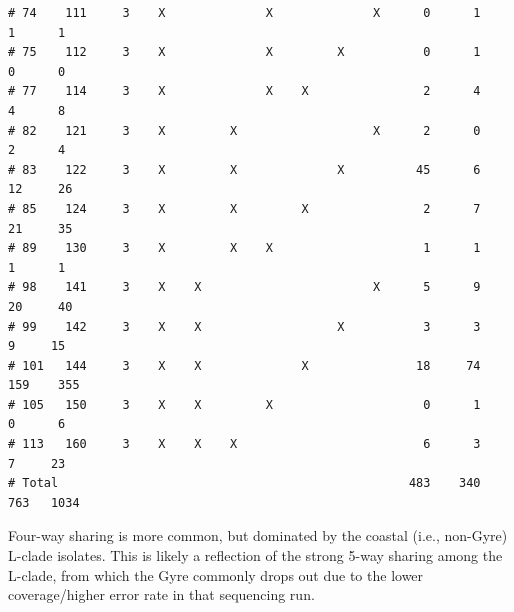 \documentclass{article}\usepackage[]{graphicx}\usepackage[]{color}
\makeatletter
\newenvironment{kframe}{%
 \def\at@end@of@kframe{}%
 \ifinner\ifhmode%
  \def\at@end@of@kframe{\end{minipage}}%
  \begin{minipage}{\columnwidth}%
 \fi\fi%
 \def\FrameCommand##1{\hskip\@totalleftmargin \hskip-\fboxsep
 \colorbox{shadecolor}{##1}\hskip-\fboxsep
     \hskip-\linewidth \hskip-\@totalleftmargin \hskip\columnwidth}%
 \MakeFramed {\advance\hsize-\width
   \@totalleftmargin\z@ \linewidth\hsize
   \@setminipage}}%
 {\par\unskip\endMakeFramed%
 \at@end@of@kframe}
\newenvironment{knitrout}{}{} %
\makeatother
\begin{document}
\begin{knitrout}
\begin{kframe}
\begin{verbatim}
# 74    111     3    X              X              X      0      1      1      1
# 75    112     3    X              X         X           0      1      0      0
# 77    114     3    X              X    X                2      4      4      8
# 82    121     3    X         X                   X      2      0      2      4
# 83    122     3    X         X              X          45      6     12     26
# 85    124     3    X         X         X                2      7     21     35
# 89    130     3    X         X    X                     1      1      1      1
# 98    141     3    X    X                        X      5      9     20     40
# 99    142     3    X    X                   X           3      3      9     15
# 101   144     3    X    X              X               18     74    159    355
# 105   150     3    X    X         X                     0      1      0      6
# 113   160     3    X    X    X                          6      3      7     23
# Total                                                 483    340    763   1034
\end{verbatim}
\end{kframe}
\end{knitrout}

Four-way sharing is more common, but dominated by the coastal (i.e., non-Gyre) L-clade isolates.  This is likely a
reflection of the strong 5-way sharing among the L-clade, from which the Gyre commonly drops out due to the lower
coverage/higher error rate in that sequencing run.
\end{document}
